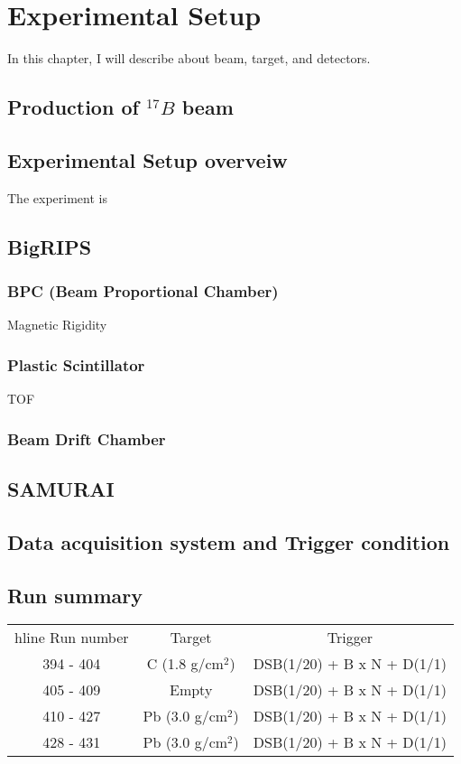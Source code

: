 \chapter{Experimental Setup}
In this chapter, I will describe about beam, target, and detectors. 
\section{Production of  ${}^{17}B$ beam}

\section{Experimental Setup overveiw}
The experiment is 
\section{BigRIPS}
\subsection{BPC (Beam Proportional Chamber)}
Magnetic Rigidity 
\subsection{Plastic Scintillator}
TOF
\subsection{Beam Drift Chamber}


\section{SAMURAI}
\section{Data acquisition system and Trigger condition}
\section{Run summary}
\begin{center}
    \begin{tabular}[h]{ccc}
         hline
        Run number& Target & Trigger \\
        394 - 404 &  C (1.8 g/cm${}^{2}$)  & DSB(1/20) + B x N + D(1/1)\\
        405 - 409 &  Empty  & DSB(1/20) + B x N + D(1/1)\\
        410 - 427 &  Pb (3.0 g/cm${}^{2}$)  & DSB(1/20) + B x N + D(1/1)\\
        428 - 431 & Pb (3.0 g/cm${}^{2}$)  & DSB(1/20) + B x N + D(1/1)\\
    \end{tabular}
\end{center}